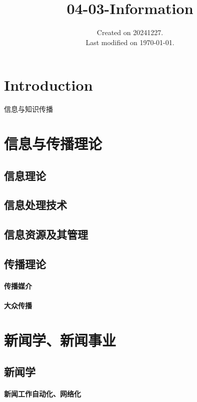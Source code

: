 \documentclass[UTF8]{../../ApplicationUniverse}
\begin{document}
\title{04-03-Information}
\date{Created on 20241227.\\   Last modified on \today.}
\maketitle
\tableofcontents


\chapter{Introduction}

信息与知识传播



\chapter{信息与传播理论}
\section{信息理论}
\section{信息处理技术}
\section{信息资源及其管理}
\section{传播理论}
    \subsubsection{传播媒介}
    \subsubsection{大众传播}



\chapter{新闻学、新闻事业}
\section{新闻学}
    \subsubsection{新闻工作自动化、网络化}
\end{document}
